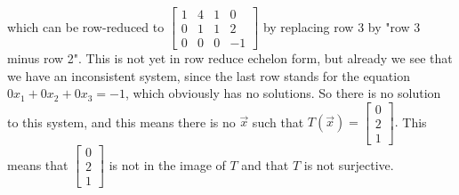 \begin{SaveQuestion}
			which can be row-reduced to   $\begin{bmatrix} 1  & 4 & 1 & 0 \\ 0 & 1 & 1 & 2 \\ 0 &  0& 0 & -1 \end{bmatrix}$ by replacing row 3 by "row 3 minus row 2".  This is not yet in row reduce echelon form, but already we see that we have an inconsistent system, since the last row stands for the equation $0x_1 + 0 x_2 + 0x_3 = -1$, which obviously has no solutions. So there is no solution to this system, and this means there is no $\vec x$ such that $T(\vec x) =  \begin{bmatrix} 0\\ 2 \\ 1  \end{bmatrix}.$ This means that  $\begin{bmatrix} 0\\ 2 \\ 1  \end{bmatrix}$ is not in the image of $T$ and that $T$ is not surjective.
\end{SaveQuestion}


